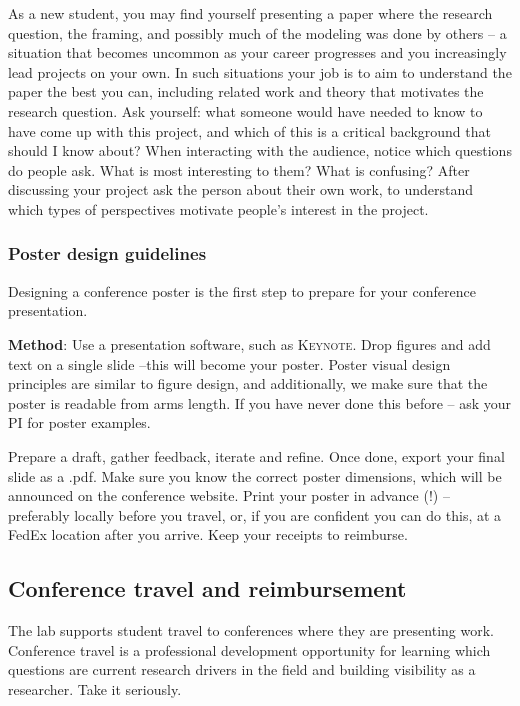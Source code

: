 \documentclass[11pt, letterpaper]{article}
\begin{document}
As a new student, you may find yourself presenting a paper where the research question, the framing, and possibly much of the modeling was done by others -- a situation that becomes uncommon as your career progresses and you increasingly lead projects on your own. In such situations your job is to aim to understand the paper the best you can, including related work and theory that motivates the research question. Ask yourself: what someone would have needed to know to have come up with this project, and which of this is a critical background that should I know about? When interacting with the audience, notice which questions do people ask. What is most interesting to them? What is confusing? After discussing your project ask the person about their own work, to understand which types of perspectives motivate people's interest in the project.

\subsubsection*{Poster design guidelines}

Designing a conference poster is the first step to prepare for your conference presentation.  

\textbf{Method}: Use a presentation software, such as \textsc{Keynote}. Drop figures and add text on a single slide --this will become your poster. Poster visual design principles are similar to figure design, and additionally, we make sure that the poster is readable from arms length. If you have never done this before -- ask your PI for poster examples. 

Prepare a draft, gather feedback, iterate and refine. Once done, export your final slide as a .pdf. Make sure you know the correct poster dimensions, which will be announced on the conference website.  Print your poster in advance (!) -- preferably locally before you travel, or, if you are confident you can do this, at a FedEx location after you arrive. Keep your receipts to reimburse.

\subsection{Conference travel and reimbursement}

The lab supports student travel to conferences where they are presenting work. Conference travel is a professional development opportunity for learning which questions are current research drivers in the field and building visibility as a researcher. Take it seriously.
\end{document}
